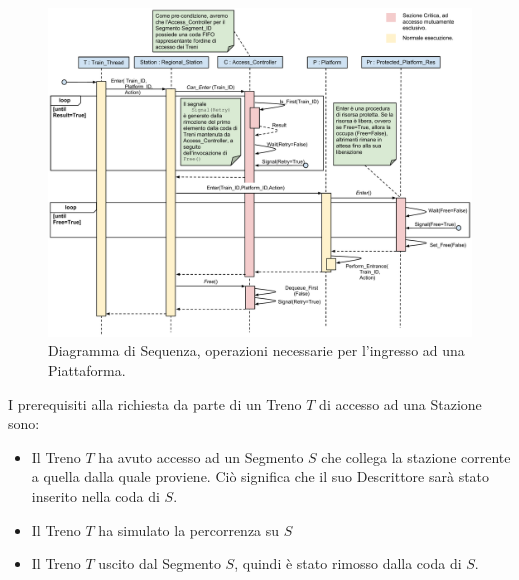 		\begin{figure}[htbp]
			\includegraphics[trim = 40mm 10mm 10mm 10mm,scale=0.45]{imgs/platform_access.pdf}
			\caption{\footnotesize{Diagramma di Sequenza, operazioni necessarie per l'ingresso ad una Piattaforma.}}
			\label{fig:platform_access}
		\end{figure}
		
		I prerequisiti alla richiesta da parte di un Treno $T$ di accesso ad una Stazione sono:
		
			\begin{itemize}
				\item Il Treno $T$ ha avuto accesso ad un Segmento $S$ che collega la stazione corrente a quella dalla quale proviene. Ciò significa che il suo Descrittore sarà stato inserito nella coda  di $S$.
				\item Il Treno $T$ ha simulato la percorrenza su $S$ 
				\item Il Treno $T$ uscito dal Segmento $S$, quindi è stato rimosso dalla coda  di $S$.
			\end{itemize}
			
